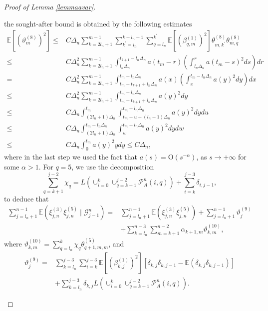 \documentclass{article}
\theoremstyle{plain}
\theoremstyle{definition}
\theoremstyle{remark}
\begin{document}
\begin{appendix}
\begin{proof}[Proof of Lemma \ref{lemmaavar}]
\begin{description}
		the sought-after bound is obtained by the following estimates
		\begin{align*}
			\mathbb{E}[(\vartheta_{m}^{(8)})^{2}]\leq & C\Delta_{n}\sum_{k=2l_{n}+1}^{m-1}\sum_{k^{\prime}=l_{n}}^{k-l_{n}-1}\sum_{q=l_{n}}^{k^{\prime}}\mathbb{E}[(\beta_{q,m}^{(1)})^{2}]\theta_{m,k^{\prime}}^{(8)}\theta_{m,q}^{(8)}\\
			\leq & C\Delta_{n}^{2}\sum_{k=2l_{n}+1}^{m-1}\int_{l_{n}\Delta_{n}}^{t_{k+1}-l_{n}\Delta_{n}}a(t_{m}-r)\left(\int_{l_{n}\Delta_{n}}^{r}a(t_{m}-s)^{2}ds\right)dr\\
			= & C\Delta_{n}^{2}\sum_{k=2l_{n}+1}^{m-1}\int_{t_{m}-t_{k+1}+l_{n}\Delta_{n}}^{t_{m}-l_{n}\Delta_{n}}a(x)\left(\int_{x}^{t_{m}-l_{n}\Delta_{n}}a(y)^{2}dy\right)dx\\
			\leq & C\Delta_{n}^{2}\sum_{k=2l_{n}+1}^{m-1}\int_{t_{m}-t_{k+1}+l_{n}\Delta_{n}}^{t_{m}-l_{n}\Delta_{n}}a(y)^{2}dy\\
			\leq & C\Delta_{n}\int_{(2l_{n}+1)\Delta_{n}}^{t_{m}}\int_{t_{m}-u+(l_{n}-1)\Delta_{n}}^{t_{m}-l_{n}\Delta_{n}}a(y)^{2}dydu\\
			\leq & C\Delta_{n}\int_{(2l_{n}+1)\Delta_{n}}^{t_{m}-l_{n}\Delta_{n}}\int_{w}^{t_{m}-l_{n}\Delta_{n}}a(y)^{2}dydw\\
			\leq & C\Delta_{n}\int_{0}^{t_{m}}a(y)^{2}ydy\leq C\Delta_{n},
		\end{align*}
		where in the last step we used the fact that $a(s)=\mathrm{O}(s^{-\alpha})$,
		as $s\rightarrow+\infty$ for some $\alpha>1$. For $q=5$, we use
		the decomposition 
		\[
		\sum_{q=k+1}^{j-2}\chi_{q}=L(\cup_{i=0}^{k}\cup_{q=k+1}^{j-2}\mathcal{P}_{A}^{n}(i,q))+\sum_{i=k}^{j-3}\delta_{i,j-1},
		\]
		to deduce that 
		\begin{align*}
			\sum_{j=l_{n}+1}^{n-1}\mathbb{E}(\xi_{j,n}^{(3)}\xi_{j,n}^{(5)}\mid\mathscr{G}_{j-1}^{n})= & \sum_{j=l_{n}+1}^{n-1}\mathbb{E}(\xi_{j,n}^{(3)}\xi_{j,n}^{(5)})+\sum_{j=l_{n}+1}^{n-1}\vartheta_{j}^{(9)}\\
			& +\sum_{k=l_{n}}^{n-3}\sum_{m=k+1}^{n-2}\alpha_{k+1,m}\vartheta_{k,m}^{(10)},
		\end{align*}
		where $\vartheta_{k,m}^{(10)}  =\sum_{q=l_{n}}^{k}\chi_{q}\theta_{q+1,m,m}^{(5)}$, and
		\begin{align*}
			\vartheta_{j}^{(9)}= & \sum_{k=l_{n}}^{j-3}\sum_{i=k}^{j-3}\mathbb{E}[(\beta_{k,j}^{(1)})^{2}][\delta_{k,j}\delta_{k,j-1}-\mathbb{E}(\delta_{k,j}\delta_{k,j-1})]\\
			& +\sum_{k=l_{n}}^{j-3}\delta_{k,j}L(\cup_{i=0}^{k}\cup_{q=k+1}^{j-2}\mathcal{P}_{A}^{n}(i,q)).	

\end{align*}
\end{description}
\end{proof}
\end{appendix}
\end{document}
